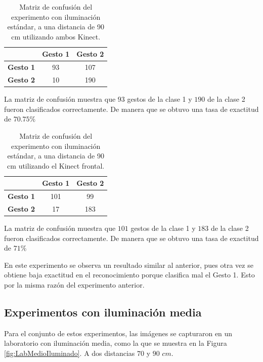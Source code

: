 \begin{itemize}
\begin{table}[h!] 
\begin{center}
\caption{Matriz de confusión del experimento con iluminación estándar, a una distancia de 90 cm utilizando ambos Kinect.}
\label{table:90LK2} 
\renewcommand{\arraystretch}{1.2}
\begin{tabular}{ r || c  c } 
        & \textbf{Gesto 1} & \textbf{Gesto 2} \\ \hline \hline  
\textbf{Gesto 1} &  93    & 107      \\ \hline  
\textbf{Gesto 2} &  10    & 190     \\   
\end{tabular}
\end{center} 
\end{table} 

La matriz de confusión muestra que $93$ gestos de la clase 1 y $190$ de la clase 2 fueron clasificados correctamente. De manera que se obtuvo una tasa de exactitud de $70.75\%$ 

\begin{table}[h!] 
\begin{center}
\caption{Matriz de confusión del experimento con iluminación estándar, a una distancia de 90 cm utilizando el Kinect frontal.}
\label{table:90LK1} 
\renewcommand{\arraystretch}{1.2}
\begin{tabular}{ r || c  c } 
        & \textbf{Gesto 1} & \textbf{Gesto 2} \\ \hline \hline  
\textbf{Gesto 1} &  101   & 99      \\ \hline  
\textbf{Gesto 2} &  17    & 183     \\   
\end{tabular}
\end{center} 
\end{table} 

La matriz de confusión muestra que $101$ gestos de la clase 1 y $183$ de la clase 2 fueron clasificados correctamente. De manera que se obtuvo una tasa de exactitud de $71 \%$  

\end{itemize}

En este experimento se observa un resultado similar al anterior, pues otra vez se obtiene baja exactitud en el reconocimiento porque clasifica mal el Gesto 1. Esto por la misma razón del experimento anterior.



\subsection{Experimentos con iluminación media} 
Para el conjunto de estos experimentos, las imágenes se capturaron en un laboratorio con iluminación media, como la que se muestra en la Figura \ref{fig:LabMedioIluminado}. A dos distancias $70$ y $90$ $cm$.  

